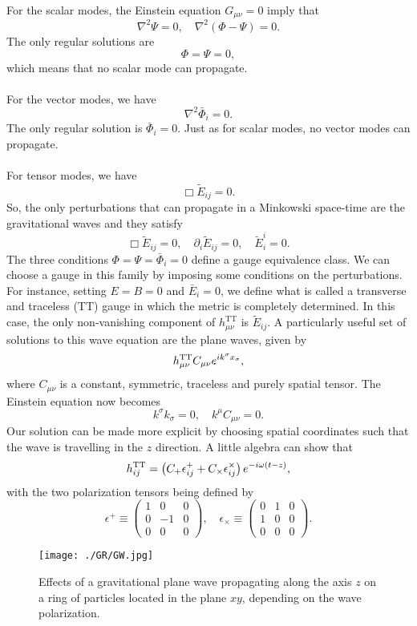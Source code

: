For the scalar modes, the Einstein equation $G_{\mu\nu} = 0$ imply that
\[\nabla^2 \Psi = 0 , \quad \nabla^2(\Phi-\Psi) = 0.\]
The only regular solutions are
\[\Phi = \Psi = 0,\]
which means that no scalar mode can propagate.
\\ \\
For the vector modes, we have
\[\nabla^2 \bar{\Phi}_i = 0.\]
The only regular solution is $\bar{\Phi}_i = 0$. Just as for scalar modes, no vector modes can propagate.
\\ \\
For tensor modes, we have
\[\Box \tilde{E}_{ij} = 0.\]
So, the only perturbations that can propagate in a Minkowski space-time are the gravitational waves and they satisfy
\[\Box \tilde{E}_{ij} = 0 , \quad \partial_i \tilde{E}_{ij} = 0 , \quad \tilde{E}^i_i = 0.\]
The three conditions $\Phi = \Psi = \bar{\Phi}_i = 0$ define a gauge equivalence class. We can choose a gauge in this family by imposing some conditions on the perturbations. For instance, setting $E = B = 0$ and $\bar{E}_i = 0$, we define what is called a transverse and traceless (TT) gauge in which the metric is completely determined. In this case, the only non-vanishing component of $h_{\mu\nu}^{\mathrm{TT}}$ is $\tilde{E}_{ij}$.
A particularly useful set of solutions to this wave 
equation are the plane waves, given by
\[h^{\rm TT}_{\mu\nu} C_{\mu\nu}e^{ik^{\sigma}x_{\sigma}},\]
where $C_{\mu\nu}$ is a constant, symmetric, traceless
and purely spatial tensor. The Einstein equation  now becomes
\[k^{\sigma}k_{\sigma} = 0, \quad k^{\mu} C_{\mu\nu} = 0.\]
Our solution can be made more explicit by choosing spatial coordinates such that the wave is travelling in the $z$ direction. A little algebra can show that
\[h_{ij}^{\rm TT} = \left( C_{+}\epsilon^+_{ij} + C_{\times} \epsilon^{\times}_{ij} \right) e^{-i\omega(t-z)},\]
with the two polarization tensors being defined by
\[\epsilon^+ \equiv \begin{pmatrix}
1 & 0 & 0\\ 0 & -1 & 0 \\ 0 & 0 & 0
\end{pmatrix} , \quad \epsilon_{\times} \equiv \begin{pmatrix}
0 & 1 & 0\\ 1 & 0 & 0 \\ 0 & 0 & 0
\end{pmatrix} .\]
\begin{figure}[!h]
\centering
\texttt{[image: ./GR/GW.jpg]}
\caption{Effects of a gravitational plane wave propagating along the axis $z$ on a ring of particles located in the plane $xy$, depending on the wave polarization.}
\end{figure}

